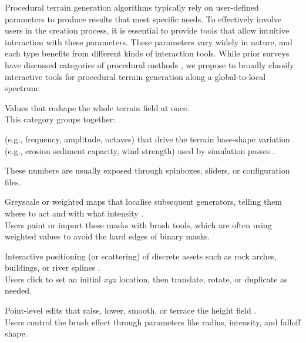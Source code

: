 Procedural terrain generation algorithms typically rely on user-defined parameters to produce results that meet specific needs. To effectively involve users in the creation process, it is essential to provide tools that allow intuitive interaction with these parameters. These parameters vary widely in nature, and each type benefits from different kinds of interaction tools. While prior surveys have discussed categories of procedural methods \cite{Smelik2009,Smelik2014,Galin2019}, we propose to broadly classify interactive tools for procedural terrain generation along a global-to-local spectrum: 
\begin{Itemize}
     Values that reshape the whole terrain field at once. \\
    This category groups together:
        \begin{Itemize}
             (e.g., frequency, amplitude, octaves) that drive the terrain base-shape variation \cite{Perlin1985,Fournier1982}.
             (e.g., erosion sediment capacity, wind strength) used by simulation passes \cite{Benes2001a,Paris2019b}.
        \end{Itemize}
        These numbers are usually exposed through spinboxes, sliders, or configuration files.

     Greyscale or weighted maps that localise subsequent generators, telling them where to act and with what intensity \cite{DeCarpentier2009,Stachniak2005}. \\
    Users paint or import these masks with brush tools, which are often using weighted values to avoid the hard edges of binary masks.

     Interactive positioning (or scattering) of discrete assets such as rock arches, buildings, or river splines \cite{Becher2017,Grosbellet2016}. \\  
    Users click to set an initial $xyz$ location, then translate, rotate, or duplicate as needed.

     Point-level edits that raise, lower, smooth, or terrace the height field \cite{Galyean1991,Gain2005,Chen2021}. \\
    Users control the brush effect through parameters like radius, intensity, and falloff shape.
\end{Itemize}

